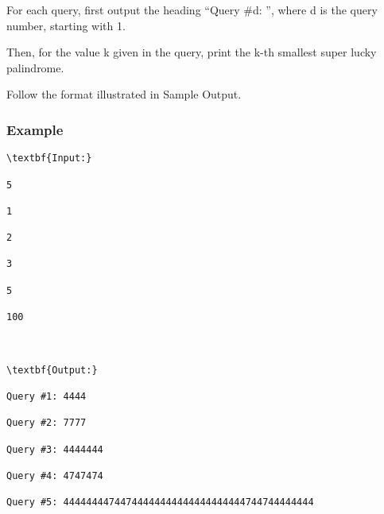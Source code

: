 For each query, first output the heading “Query \#d: ”, where d is the query number, starting with 1.

Then, for the value k given in the query, print the k-th smallest super lucky palindrome.

Follow the format illustrated in Sample Output.

\subsubsection{Example}
\begin{verbatim}
\textbf{Input:}

5

1

2

3

5

100



\textbf{Output:}

Query #1: 4444

Query #2: 7777

Query #3: 4444444

Query #4: 4747474

Query #5: 44444444744744444444444444444444744744444444

\end{verbatim}